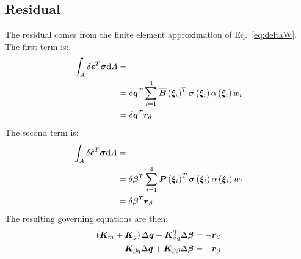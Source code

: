 \subsection{Residual}
The residual comes from the finite element approximation of Eq.~\ref{eq:deltaW}. \\
The first term is:
\begin{equation}
\begin{split}
\int_A \delta{\bm{\epsilon}}^T \bm{\sigma} \text{d}A & = \\
& = \delta \bm{q}^T \sum_{i=1}^{4} \overline{\bm{B}}\left(  \bm{ \xi }_{ i }  \right)^T  \bm{\sigma}\left(  \bm{ \xi }_{ i }  \right)  \alpha \left(  \bm{ \xi }_{ i }  \right)  w_i \\
& = \delta \bm{q}^T \bm{r}_{d}
\end{split}
\end{equation}
The second term is:
\begin{equation}
\begin{split}
\int_A \delta \hat{\bm{\epsilon}}^T \bm{\sigma} \text{d}A & = \\
& = \delta \bm{\beta}^T \sum_{i=1}^{4} \bm{P}\left(  \bm{ \xi }_{ i }  \right)^T  \bm{\sigma}\left(  \bm{ \xi }_{ i }  \right)  \alpha \left(  \bm{ \xi }_{ i }  \right)  w_i \\
& = \delta \bm{\beta}^T \bm{r}_{\beta}
\end{split}
\end{equation}
The resulting governing equations are then:
\begin{subequations}
\begin{align}
\left(  \bm{K}_m + \bm{K}_g  \right) \Delta \bm{q} + \bm{K}_{\beta q} ^ T \Delta \bm{\beta} & = - \bm{r}_{d} \\
\bm{K}_{\beta q}  \Delta \bm{q} + \bm{K}_{\beta \beta}  \Delta \bm{\beta} & = - \bm{r}_{\beta} \\
\end{align}
\end{subequations}
